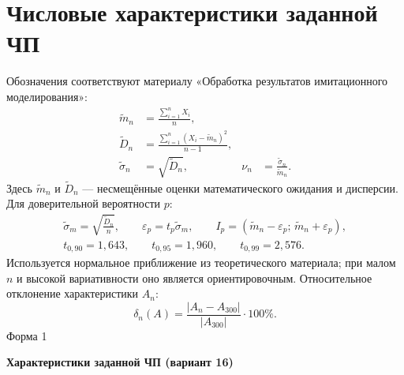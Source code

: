 \documentclass[12pt,a4paper]{article}
\newcommand{\formtitle}[2]{\noindent\hfill Форма #1\par\begin{center}\textbf{#2}\end{center}}
\newcommand{\mm}{\widetilde m}
\newcommand{\DD}{\widetilde D}
\newcommand{\ssig}{\widetilde\sigma}
\begin{document}
\section{Числовые характеристики заданной ЧП}
Обозначения соответствуют материалу «Обработка результатов имитационного моделирования»:
\begin{align}
\mm_n&=\frac{\displaystyle\sum_{i=1}^{n}X_i}{n},\label{eq:mean}\\
\DD_n&=\frac{\displaystyle\sum_{i=1}^{n}(X_i-\mm_n)^2}{n-1},\label{eq:var}\\
\ssig_n&=\sqrt{\DD_n},&
\nu_n&=\frac{\ssig_n}{\mm_n}.\label{eq:cv}
\end{align}
Здесь $\mm_n$ и $\DD_n$ --- несмещённые оценки математического ожидания и дисперсии. Для доверительной вероятности $p$:
\begin{gather}
\ssig_m=\sqrt{\frac{\DD_n}{n}},\qquad
\varepsilon_p=t_p\ssig_m,\qquad
I_p=(\mm_n-\varepsilon_p;\,\mm_n+\varepsilon_p),\label{eq:ci}\\
t_{0{,}90}=1{,}643,\qquad t_{0{,}95}=1{,}960,\qquad t_{0{,}99}=2{,}576.
\end{gather}
Используется нормальное приближение из теоретического материала; при малом $n$ и высокой вариативности оно является ориентировочным.
Относительное отклонение характеристики $A_n$:
\begin{equation}
\delta_n(A)=\frac{|A_n-A_{300}|}{|A_{300}|}\cdot100\%.\label{eq:delta}
\end{equation}
\newpage
\formtitle{1}{Характеристики заданной ЧП (вариант 16)}
\end{document}
